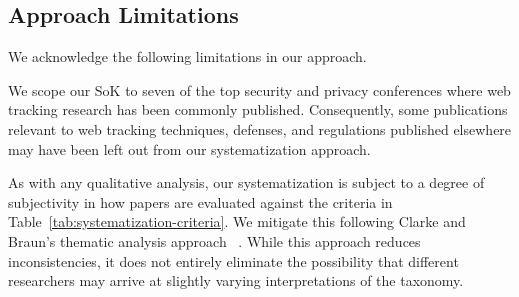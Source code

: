 \begin{table}[t]
\begin{tabular}{p{0.03cm} p{9.2cm} p{7.0cm}}
\midrule


\bottomrule
\end{tabular}
\end{table}



\subsection{Approach Limitations}

\noindent We acknowledge the following limitations in our approach.

 We scope our SoK to seven of the top security and privacy conferences where web tracking research has been commonly published. Consequently, some publications relevant to web tracking techniques, defenses, and regulations published elsewhere may have been left out from our systematization approach. 

As with any qualitative analysis, our systematization is subject to a degree of subjectivity in how papers are evaluated against the criteria in Table~\ref{tab:systematization-criteria}. We mitigate this following Clarke and Braun's thematic analysis approach~\cite{clarke2013successful}
. While this approach reduces inconsistencies, it does not entirely eliminate the possibility that different researchers may arrive at slightly varying interpretations of the taxonomy.

